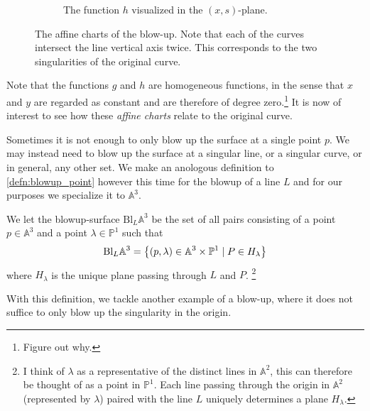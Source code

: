 \documentclass{article}
\newcommand{\A}{\mathbb{A}}
\newcommand{\Bu}[2]{\mathrm{Bl}_{#1}\A^{#2}}
\renewcommand{\P}{\mathbb{P}}
\begin{document}
\begin{example}
\begin{figure}[h!]
\begin{subfigure}[t]{0.3\textwidth}
            \caption{The function $h$ visualized in the $(x, s)$-plane.}
        \end{subfigure}
        \caption{The affine charts of the blow-up. Note that each of the curves
        intersect the line vertical axis twice. This corresponds to the two
        singularities of the original curve.}
    \end{figure}
    Note that the functions $g$ and $h$ are homogeneous functions, in the sense
    that $x$ and $y$ are regarded as constant and are therefore of degree
    zero.\footnote{Figure out why.} It is now of interest to see how these
    \emph{affine charts} relate to the original curve.
\end{example}

Sometimes it is not enough to only blow up the surface at a single point $p$.
We may instead need to blow up the surface at a singular line, or a singular
curve, or in general, any other set. We make an anologous definition to
\cref{defn:blowup_point} however this time for the blowup of a line $L$ and
for our purposes we specialize it to $\A^3$.

\begin{definition}[Blowup of $\A^3$ along a line $L$]
    We let the blowup-surface $\Bu{L}{3}$ be the set of all pairs consisting of
    a point $p \in \A^3$ and a point $\lambda \in \P^{1}$ such that
    \begin{equation}
        \notag
        \Bu{L}{3} = \left\{ (p, \lambda) \in \A^3\times\P^1 \mid P \in H_\lambda \right\}
    \end{equation}
    where $H_\lambda$ is the unique plane passing through $L$ and
    $P$.
    \footnote{I think of $\lambda$ as a representative of the distinct lines in
        $\A^2$, this can therefore be thought of as a point in $\P^1$.  Each
        line passing through the origin in $\A^2$ (represented by $\lambda$)
        paired with the line $L$ uniquely determines a plane $H_\lambda$.}
\end{definition}

With this definition, we tackle another example of a blow-up, where it does not
suffice to only blow up the singularity in the origin.
\end{document}
